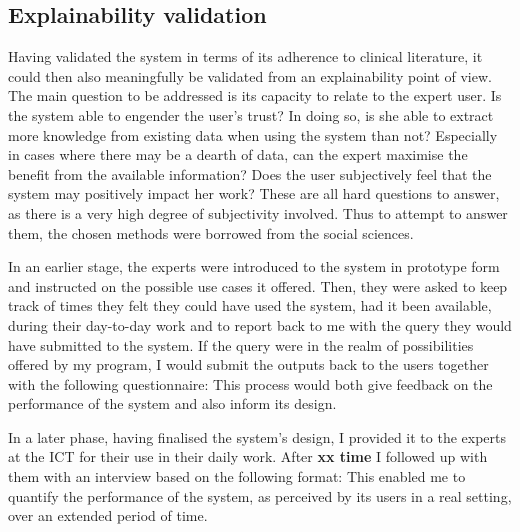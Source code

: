 
\subsection{Explainability validation} \label{subsec:explainability-validation}
Having validated the system in terms of its adherence to clinical literature, it could then also meaningfully be validated from an explainability point of view.
The main question to be addressed is its capacity to relate to the expert user.
Is the system able to engender the user's trust?
In doing so, is she able to extract more knowledge from existing data when using the system than not?
Especially in cases where there may be a dearth of data, can the expert maximise the benefit from the available information?
Does the user subjectively feel that the system may positively impact her work?
These are all hard questions to answer, as there is a very high degree of subjectivity involved.
Thus to attempt to answer them, the chosen methods were borrowed from the social sciences.

In an earlier stage, the experts were introduced to the system in prototype form and instructed on the possible use cases it offered.
Then, they were asked to keep track of times they felt they could have used the system, had it been available, during their day-to-day work and to report back to me with the query they would have submitted to the system.
If the query were in the realm of possibilities offered by my program, I would submit the outputs back to the users together with the following questionnaire:
This process would both give feedback on the performance of the system and also inform its design.

In a later phase, having finalised the system's design, I provided it to the experts at the ICT for their use in their daily work.
After \textbf{xx time} I followed up with them with an interview based on the following format:
This enabled me to quantify the performance of the system, as perceived by its users in a real setting, over an extended period of time.


